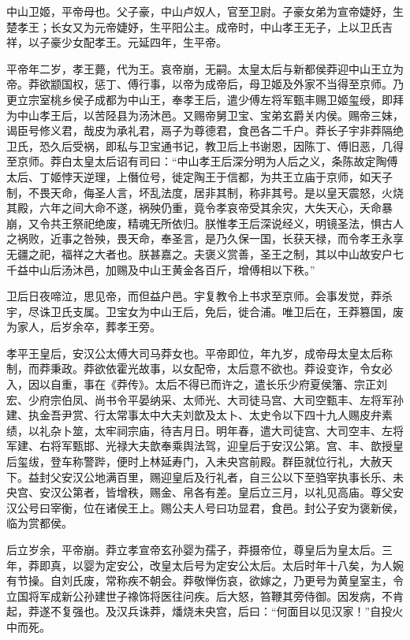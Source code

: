 \documentclass[12pt,UTF8]{ctexbook}
\begin{document}
中山卫姬，平帝母也。父子豪，中山卢奴人，官至卫尉。子豪女弟为宣帝婕妤，生楚孝王；长女又为元帝婕妤，生平阳公主。成帝时，中山孝王无子，上以卫氏吉祥，以子豪少女配孝王。元延四年，生平帝。



平帝年二岁，孝王薨，代为王。哀帝崩，无嗣。太皇太后与新都侯莽迎中山王立为帝。莽欲颛国权，惩丁、傅行事，以帝为成帝后，母卫姬及外家不当得至京师。乃更立宗室桃乡侯子成都为中山王，奉孝王后，遣少傅左将军甄丰赐卫姬玺绶，即拜为中山孝王后，以苦陉县为汤沐邑。又赐帝舅卫宝、宝弟玄爵关内侯。赐帝三妹，谒臣号修义君，哉皮为承礼君，鬲子为尊德君，食邑各二千户。莽长子宇非莽隔绝卫氏，恐久后受祸，即私与卫宝通书记，教卫后上书谢恩，因陈丁、傅旧恶，几得至京师。莽白太皇太后诏有司曰：“中山孝王后深分明为人后之义，条陈故定陶傅太后、丁姬悖天逆理，上僭位号，徙定陶王于信都，为共王立庙于京师，如天子制，不畏天命，侮圣人言，坏乱法度，居非其制，称非其号。是以皇天震怒，火烧其殿，六年之间大命不遂，祸殃仍重，竟令孝哀帝受其余灾，大失天心，夭命暴崩，又令共王祭祀绝废，精魂无所依归。朕惟孝王后深说经义，明镜圣法，惧古人之祸败，近事之咎殃，畏天命，奉圣言，是乃久保一国，长获天禄，而令孝王永享无疆之祀，福祥之大者也。朕甚嘉之。夫褒义赏善，圣王之制，其以中山故安户七千益中山后汤沐邑，加赐及中山王黄金各百斤，增傅相以下秩。”



卫后日夜啼泣，思见帝，而但益户邑。宇复教令上书求至京师。会事发觉，莽杀宇，尽诛卫氏支属。卫宝女为中山王后，免后，徙合浦。唯卫后在，王莽篡国，废为家人，后岁余卒，葬孝王旁。



孝平王皇后，安汉公太傅大司马莽女也。平帝即位，年九岁，成帝母太皇太后称制，而莽秉政。莽欲依霍光故事，以女配帝，太后意不欲也。莽设变诈，令女必入，因以自重，事在《莽传》。太后不得已而许之，遣长乐少府夏侯籓、宗正刘宏、少府宗伯凤、尚书令平晏纳采、太师光、大司徒马宫、大司空甄丰、左将军孙建、执金吾尹赏、行太常事太中大夫刘歆及太卜、太史令以下四十九人赐皮弁素绩，以礼杂卜筮，太牢祠宗庙，待吉月日。明年春，遣大司徒宫、大司空丰、左将军建、右将军甄邯、光禄大夫歆奉乘舆法驾，迎皇后于安汉公第。宫、丰、歆授皇后玺绂，登车称警跸，便时上林延寿门，入未央宫前殿。群臣就位行礼，大赦天下。益封父安汉公地满百里，赐迎皇后及行礼者，自三公以下至驺宰执事长乐、未央宫、安汉公第者，皆增秩，赐金、帛各有差。皇后立三月，以礼见高庙。尊父安汉公号曰宰衡，位在诸侯王上。赐公夫人号曰功显君，食邑。封公子安为褒新侯，临为赏都侯。



后立岁余，平帝崩。莽立孝宣帝玄孙婴为孺子，莽摄帝位，尊皇后为皇太后。三年，莽即真，以婴为定安公，改皇太后号为定安公太后。太后时年十八矣，为人婉有节操。自刘氏废，常称疾不朝会。莽敬惮伤哀，欲嫁之，乃更号为黄皇室主，令立国将军成新公孙建世子襐饰将医往问疾。后大怒，笞鞭其旁侍御。因发病，不肯起，莽遂不复强也。及汉兵诛莽，燔烧未央宫，后曰：“何面目以见汉家！”自投火中而死。
\end{document}
